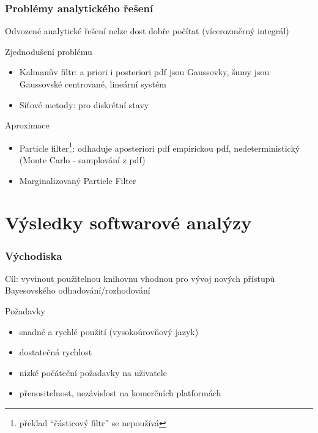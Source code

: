 \documentclass[12pt]{beamer}
\begin{document}
\begin{frame}
	\frametitle{Problémy analytického řešení}

	{\large Odvozené analytické řešení nelze dost dobře počítat} (vícerozměrný integrál)

	\begin{block}{Zjednodušení problému}
		\begin{itemize}
			\item Kalmanův filtr: a priori i posteriori pdf jsou Gaussovky, šumy jsou Gaussovské
			centrované, lineární systém
			\item Síťové metody: pro diskrétní stavy
		\end{itemize}
	\end{block}

	\begin{block}{Aproximace}
		\begin{itemize}
			\item Particle filter\footnote{překlad ``částicový filtr'' se nepoužívá}: odhaduje aposteriori pdf empirickou pdf,
			nedeterministický (Monte Carlo - samplování z pdf)
			\item Marginalizovaný Particle Filter
		\end{itemize}
	\end{block}

\end{frame}

\section{Výsledky softwarové analýzy}

\begin{frame}
	\frametitle{Východiska}

	Cíl: vyvinout použitelnou knihovnu vhodnou pro vývoj nových přístupů Bayesovského
	odhadování/rozhodování

 	\begin{block}{Požadavky}
		\begin{itemize}
			\item snadné a rychlé použití (vysokoúrovňový jazyk)
			\item dostatečná rychlost
			\item nízké počáteční požadavky na uživatele
			\item přenositelnost, nezávislost na komerčních platformách
		\end{itemize}
 	\end{block}
\end{frame}
\end{document}

